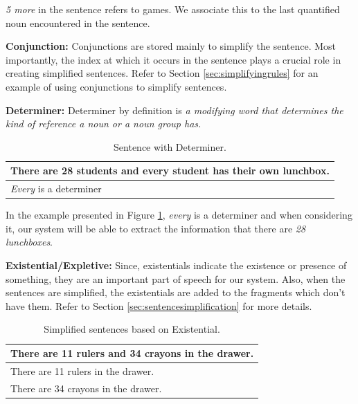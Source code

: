 \documentclass[11pt]{article}
\begin{document}
\textit{5 more} in the sentence refers to games. We associate this to the last quantified noun encountered in the sentence.
\vspace{4mm}

\newpage

\textbf{Conjunction:} Conjunctions are stored mainly to simplify the sentence. Most importantly, the index at which it occurs in the sentence plays a crucial role in creating simplified sentences. Refer to Section \ref{sec:simplifyingrules} for an example of using conjunctions to simplify sentences.
\vspace{4mm}

\textbf{Determiner:} Determiner by definition is \textit{a modifying word that determines the kind of reference a noun or a noun group has.} 

\begin{table}[h!]
\centering
\begin{tabular}{ | m{25em} | }
\hline
\textbf{There are 28 students and every student has their own lunchbox.}\\
\hline
\textit{Every} is a determiner\\
\hline
\end{tabular}
\caption{Sentence with Determiner.}
\label{figure:4}
\end{table}

In the example presented in Figure \ref{figure:4}, \textit{every} is a determiner and when considering it, our system will be able to extract the information that there are \textit{28 lunchboxes}.
\vspace{4mm}

\textbf{Existential/Expletive:} Since, existentials indicate the existence or presence of something, they are an important part of speech for our system. Also, when the sentences are simplified, the existentials are added to the fragments which don't have them. Refer to Section \ref{sec:sentencesimplification} for more details.

\begin{table}[h!]
\centering
\begin{tabular}{ | m{25em} | }
\hline
\textbf{There are 11 rulers and 34 crayons in the drawer.}\\
\hline
There are 11 rulers in the drawer.\\
\hline
There are 34 crayons in the drawer.\\
\hline
\end{tabular}
\caption{Simplified sentences based on Existential.}
\label{figure:5}
\end{table}
\end{document}
